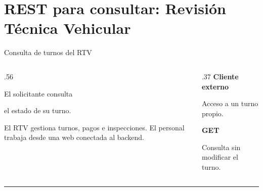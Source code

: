 \section{REST para consultar: Revisión Técnica Vehicular}
\begin{frame}{Consulta de turnos del RTV}
\begin{columns}[T,onlytextwidth]
\begin{column}{.56\textwidth}
{\Large El solicitante consulta\par el estado de su turno.}\par\medskip
El RTV gestiona turnos, pagos e inspecciones. El personal trabaja desde una web conectada al backend.
\end{column}
\begin{column}{.37\textwidth}
{\color{acento}\bfseries Cliente externo}\par\smallskip
Acceso a un turno propio.\par\medskip
{\color{acento}\bfseries GET}\par\smallskip
Consulta sin modificar el turno.
\end{column}
\end{columns}
\vspace{6mm}
{\color{borde}\hrule}\medskip
{}
\end{frame}

